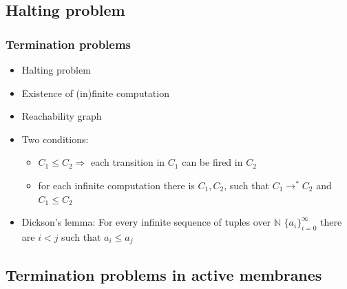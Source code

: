   \subsection{Halting problem} %
  \label{sub:halting_problem}
  
    \begin{frame}[t]\frametitle{Termination problems}
      \begin{itemize}
        \item Halting problem
        \pause
        \item Existence of (in)finite computation
        \pause
        \item Reachability graph
        \pause
        \item Two conditions:
        \begin{itemize}
          \item $C_1 \leq C_2 \Rightarrow$ each transition in $C_1$ can be fired in $C_2$
          \pause
          \item for each infinite computation there is $C_1, C_2$, such that $C_1 \rightarrow^* C_2$ and $C_1 \leq C_2$
        \end{itemize}
        \pause
        \item Dickson's lemma: For every infinite sequence of tuples over $\mathbb{N}$ $\{a_i\}_{i=0}^\infty$ there are $i<j$ such that $a_i\leq a_j$
      \end{itemize}

    \end{frame}
    \note{}



  \subsection{Termination problems in active membranes} %
  \label{sub:termination_problems_in_active_membranes}

